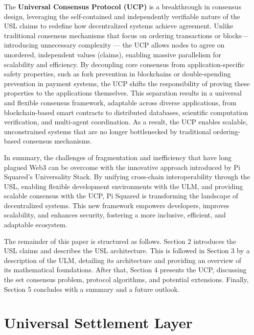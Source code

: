 \documentclass{article}
\newcommand{\UniCon}{Universal Consensus Protocol}
\newcommand{\UC}{UCP}
\begin{document}
The \textbf{\UniCon{} (\UC{})} is a breakthrough in consensus design, leveraging the self-contained and independently verifiable nature of the USL claims to redefine how decentralized systems achieve agreement. Unlike traditional consensus mechanisms that focus on ordering transactions or blocks—introducing unnecessary complexity — the \UC{} allows nodes to agree on unordered, independent values (claims), enabling massive parallelism for scalability and efficiency. By decoupling core consensus from application-specific safety properties, such as fork prevention in blockchains or double-spending prevention in payment systems, the \UC{} shifts the responsibility of proving these properties to the applications themselves. This separation results in a universal and flexible consensus framework, adaptable across diverse applications, from blockchain-based smart contracts to distributed databases, scientific computation verification, and multi-agent coordination. As a result, the \UC{} enables scalable, unconstrained systems that are no longer bottlenecked by traditional ordering-based consensus mechanisms.

In summary, the challenges of fragmentation and inefficiency that have long plagued Web3 can be overcome with the innovative approach introduced by Pi Squared's Universality Stack. By unifying cross-chain interoperability through the USL, enabling flexible development environments with the ULM, and providing scalable consensus with the \UC{}, Pi Squared is transforming the landscape of decentralized systems. This new framework empowers developers, improves scalability, and enhances security, fostering a more inclusive, efficient, and adaptable ecosystem.

The remainder of this paper is structured as follows. Section 2 introduces the USL claims and describes the USL architecture. This is followed in Section 3 by a description of the ULM, detailing its architecture and providing an overview of its mathematical foundations. After that, Section 4 presents the \UC{}, discussing the set consensus problem, protocol algorithms, and potential extensions. Finally, Section 5 concludes with a summary and a future outlook. 











\section{Universal Settlement Layer}
\label{usl}
\end{document}
